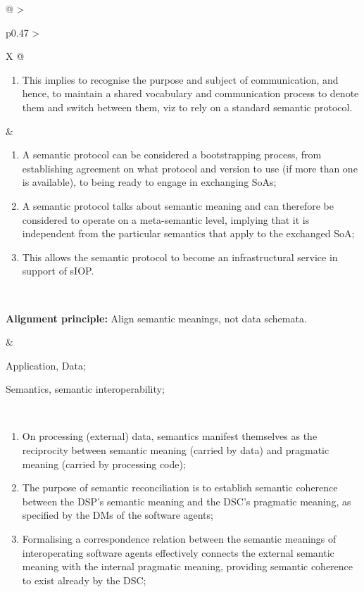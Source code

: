 \begin{xltabular}[l]{\linewidth}{@{} >{\small\raggedright\arraybackslash}p{0.47\linewidth} >{\small\raggedright\arraybackslash}X @{}}
\begin{enumerate}[left=6pt, nosep]
  \item This implies to recognise the purpose and subject of communication, and hence, to maintain a shared vocabulary and communication process to denote them and switch between them, viz to rely on a standard semantic protocol.
\end{enumerate}
&
\begin{enumerate}[left=10pt, nosep]
  \item A semantic protocol can be considered a bootstrapping process, from establishing agreement on what protocol and version to use (if more than one is available), to being ready to engage in exchanging SoAs;
  \item A semantic protocol talks about semantic meaning and can therefore be considered to operate on a meta-semantic level, implying that it is independent from the particular semantics that apply to the exchanged SoA;
  \item This allows the semantic protocol to become an infrastructural service in support of sIOP.
\end{enumerate} \\
%
%
%
\begin{mmdp}\label{dp:alignment}{\bfseries Alignment principle:}
\quad Align semantic meanings, not data schemata.  \end{mmdp}
&
\begin{description}[labelwidth=3.7cm,leftmargin=3.7cm+1ex,nosep,topsep=2ex,labelsep=1ex,font=\bfseries]
  \item[Type of information:] Application, Data;
  \item[Quality attributes:] Semantics, semantic interoperability;
\end{description}\\
\begin{enumerate}[left=6pt, nosep]
  \item On processing (external) data, semantics manifest themselves as the reciprocity between semantic meaning (carried by data) and pragmatic meaning (carried by processing code);
  \item The purpose of semantic reconciliation is to establish semantic coherence between the DSP's semantic meaning and the DSC's pragmatic meaning, as specified by the DMs of the software agents;
  \item Formalising a correspondence relation between the semantic meanings of interoperating software agents effectively connects the external semantic meaning with the internal pragmatic meaning, providing semantic coherence to exist already by the DSC;

\end{enumerate}
\end{xltabular}
